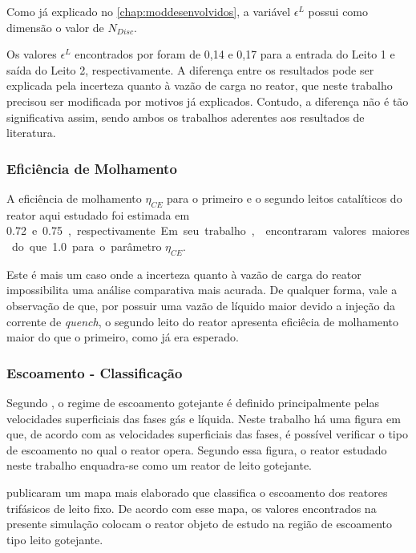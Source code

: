 Como já explicado no \autoref{chap:moddesenvolvidos}, a variável $\epsilon^{L}$
possui como dimensão o valor de $N_{Disc}$.

Os valores $\epsilon^{L}$ encontrados por  foram de
0,14 e 0,17 para a entrada do Leito 1 e saída do Leito 2,
respectivamente. A diferença entre os resultados pode ser explicada pela
incerteza quanto à vazão de carga no reator, que neste trabalho precisou ser
modificada por motivos já explicados. Contudo, a diferença não é tão
significativa assim, sendo ambos os trabalhos aderentes aos resultados de
literatura.

\subsubsection{Eficiência de Molhamento} \label{eficienciademolhamento}

A eficiência de molhamento $\eta_{CE}$ para o primeiro e o segundo leitos
catalíticos do reator aqui estudado foi estimada em \SI{0,72} e \SI{0,75},
respectivamente. Em seu trabalho,  encontraram valores
maiores do que \SI{1,0} para o parâmetro $\eta_{CE}$.

Este é mais um caso onde a incerteza quanto à vazão de carga do reator
impossibilita uma análise comparativa mais acurada. De qualquer forma, vale a
observação de que, por possuir uma vazão de líquido maior devido a injeção da
corrente de \emph{quench}, o segundo leito do reator apresenta eficiêcia de
molhamento maior do que o primeiro, como já era esperado.

\subsubsection{Escoamento - Classificação} \label{escoamentoclassificacao}

Segundo , o regime de escoamento gotejante é definido
principalmente pelas velocidades superficiais das fases gás e líquida. Neste
trabalho há uma figura em que, de acordo com as velocidades superficiais das
fases, é possível verificar o tipo de escoamento no qual o reator opera. Segundo
essa figura, o reator estudado neste trabalho enquadra-se como um reator de
leito gotejante.

 publicaram um mapa mais elaborado que classifica o
escoamento dos reatores trifásicos de leito fixo. De acordo com esse mapa, os
valores encontrados na presente simulação colocam o reator objeto de estudo na
região de escoamento tipo leito gotejante.

